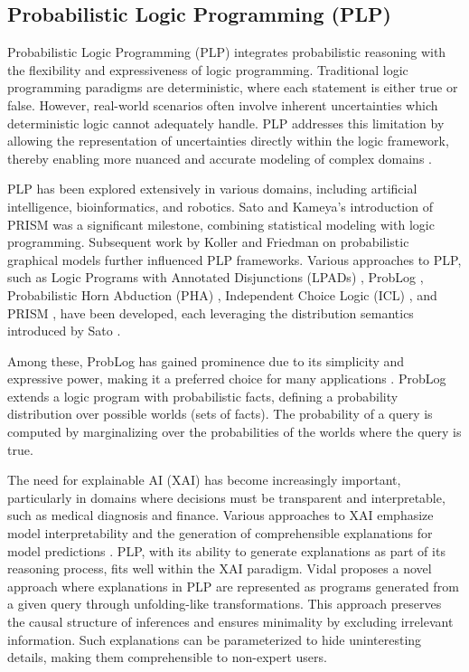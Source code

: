 \subsection{Probabilistic Logic Programming (PLP)}

Probabilistic Logic Programming (PLP) integrates probabilistic reasoning with the flexibility and expressiveness of logic programming. Traditional logic programming paradigms are deterministic, where each statement is either true or false. However, real-world scenarios often involve inherent uncertainties which deterministic logic cannot adequately handle. PLP addresses this limitation by allowing the representation of uncertainties directly within the logic framework, thereby enabling more nuanced and accurate modeling of complex domains \cite{Sato2001, Kimmig2011}.

PLP has been explored extensively in various domains, including artificial intelligence, bioinformatics, and robotics. Sato and Kameya's introduction of PRISM \cite{Sato1997} was a significant milestone, combining statistical modeling with logic programming. Subsequent work by Koller and Friedman \cite{Koller2009} on probabilistic graphical models further influenced PLP frameworks. Various approaches to PLP, such as Logic Programs with Annotated Disjunctions (LPADs) \cite{Vennekens2004}, ProbLog \cite{DeRaedt2007}, Probabilistic Horn Abduction (PHA) \cite{Poole1993}, Independent Choice Logic (ICL) \cite{Poole1997}, and PRISM \cite{Sato2001}, have been developed, each leveraging the distribution semantics introduced by Sato \cite{Sato2001}.

Among these, ProbLog has gained prominence due to its simplicity and expressive power, making it a preferred choice for many applications \cite{Kimmig2011}. ProbLog extends a logic program with probabilistic facts, defining a probability distribution over possible worlds (sets of facts). The probability of a query is computed by marginalizing over the probabilities of the worlds where the query is true.

The need for explainable AI (XAI) has become increasingly important, particularly in domains where decisions must be transparent and interpretable, such as medical diagnosis and finance. Various approaches to XAI emphasize model interpretability and the generation of comprehensible explanations for model predictions \cite{Arrieta2020}. PLP, with its ability to generate explanations as part of its reasoning process, fits well within the XAI paradigm. Vidal \cite{Vidal2023} proposes a novel approach where explanations in PLP are represented as programs generated from a given query through unfolding-like transformations. This approach preserves the causal structure of inferences and ensures minimality by excluding irrelevant information. Such explanations can be parameterized to hide uninteresting details, making them comprehensible to non-expert users.



